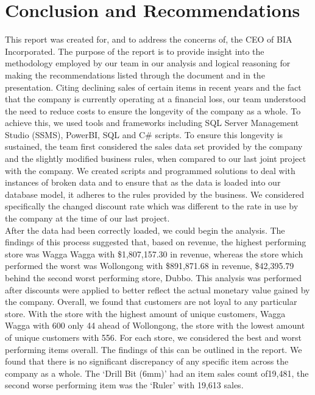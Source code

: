 \documentclass{article}
\begin{document}
    \section{Conclusion and Recommendations}
    \label{sec:Conclusion}
    This report was created for, and to address the concerns of, the CEO of BIA Incorporated.  
    The purpose of the report is to provide insight into the methodology employed by our 
    team in our analysis and logical reasoning for making the recommendations listed through 
    the document and in the presentation.  Citing declining sales of certain items in recent 
    years and the fact that the company is currently operating at a financial loss, our team 
    understood the need to reduce costs to ensure the longevity of the company as a whole.  
    To achieve this, we used tools and frameworks  including  SQL  Server  Management  
    Studio (SSMS), PowerBI, SQL  and C\# scripts. To ensure  this longevity is 
    sustained, the team first considered the sales data set provided by the company 
    and the slightly modified business rules, when compared to our last joint project 
    with the company. We created scripts and programmed solutions to deal with instances 
    of broken data and to ensure that as the data is loaded into our database model, it 
    adheres to the rules provided by the business.  We considered specifically the changed 
    discount rate which was different to the rate in use by the company at the time of our last project.\\

    After the data had been correctly loaded, we could begin the analysis. The findings 
    of this process suggested that, based on revenue, the highest performing store was 
    Wagga Wagga with \$1,807,157.30 in revenue, whereas the store which performed the 
    worst was Wollongong with \$891,871.68 in revenue, \$42,395.79 behind the second 
    worst performing  store,  Dubbo.   This  analysis  was  performed  after  discounts  
    were  applied  to  better  reflect  the  actual monetary value gained by the company.  
    Overall, we found that customers are not loyal to any particular store. With the store 
    with the highest amount of unique customers, Wagga Wagga with 600 only 44 ahead of 
    Wollongong, the store with the lowest amount of unique customers with 556.  For each 
    store, we considered the best and worst performing items overall.  The findings of 
    this can be outlined in the report.  We found that there is no significant discrepancy 
    of any specific item across the company as a whole.  The ‘Drill Bit (6mm)’ had an 
    item sales count of19,481, the second worse performing item was the ‘Ruler’ with 
    19,613 sales.\\
\end{document}
